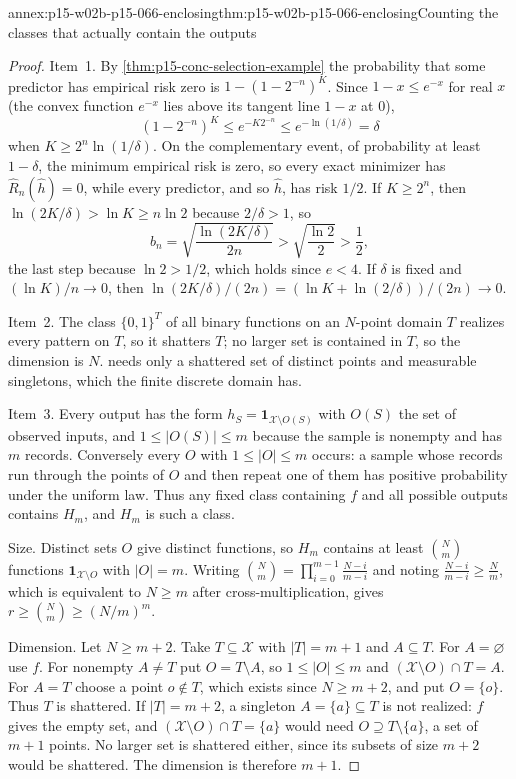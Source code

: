 \begin{annexitem}{annex:p15-w02b-p15-066-enclosing}{thm:p15-w02b-p15-066-enclosing}{Counting the classes that actually contain the outputs}
\begin{proof}
Item~1. By \cref{thm:p15-conc-selection-example} the probability that
some predictor has empirical risk zero is \(1-(1-2^{-n})^K\). Since
\(1-x\leq e^{-x}\) for real \(x\) (the convex function \(e^{-x}\) lies
above its tangent line \(1-x\) at \(0\)),
\[
 (1-2^{-n})^K\leq e^{-K2^{-n}}\leq e^{-\ln(1/\delta)}=\delta
\]
when \(K\geq2^n\ln(1/\delta)\). On the complementary event, of
probability at least \(1-\delta\), the minimum empirical risk is zero,
so every exact minimizer has \(\widehat R_n(\widehat h)=0\), while every
predictor, and so \(\widehat h\), has risk \(1/2\). If \(K\geq2^n\),
then \(\ln(2K/\delta)>\ln K\geq n\ln2\) because \(2/\delta>1\), so
\[
 b_n=\sqrt{\frac{\ln(2K/\delta)}{2n}}>\sqrt{\frac{\ln2}2}>\frac12,
\]
the last step because \(\ln2>1/2\), which holds since \(e<4\). If
\(\delta\) is fixed and \((\ln K)/n\to0\), then
\(\ln(2K/\delta)/(2n)=(\ln K+\ln(2/\delta))/(2n)\to0\).

Item~2. The class \(\{0,1\}^T\) of all binary functions on an
\(N\)-point domain \(T\) realizes every pattern on \(T\), so it shatters
\(T\); no larger set is contained in \(T\), so the dimension is \(N\).
 needs only a shattered set
of distinct points and measurable singletons, which the finite discrete
domain has.

Item~3. Every output has the form \(h_S=\mathbf1_{\mathcal X\setminus O(S)}\)
with \(O(S)\) the set of observed inputs, and \(1\leq|O(S)|\leq m\)
because the sample is nonempty and has \(m\) records. Conversely every
\(O\) with \(1\leq|O|\leq m\) occurs: a sample whose records run through
the points of \(O\) and then repeat one of them has positive probability
under the uniform law. Thus any fixed class containing \(f\) and all
possible outputs contains \(H_m\), and \(H_m\) is such a class.

Size. Distinct sets \(O\) give distinct functions, so \(H_m\) contains at
least \(\binom Nm\) functions \(\mathbf1_{\mathcal X\setminus O}\) with
\(|O|=m\). Writing
\(\binom Nm=\prod_{i=0}^{m-1}\frac{N-i}{m-i}\) and noting
\(\frac{N-i}{m-i}\geq\frac Nm\), which is equivalent to \(N\geq m\)
after cross-multiplication, gives \(r\geq\binom Nm\geq(N/m)^m\).

Dimension. Let \(N\geq m+2\). Take \(T\subseteq\mathcal X\) with
\(|T|=m+1\) and \(A\subseteq T\). For \(A=\varnothing\) use \(f\). For
nonempty \(A\ne T\) put \(O=T\setminus A\), so \(1\leq|O|\leq m\) and
\((\mathcal X\setminus O)\cap T=A\). For \(A=T\) choose a point
\(o\notin T\), which exists since \(N\geq m+2\), and put \(O=\{o\}\).
Thus \(T\) is shattered. If \(|T|=m+2\), a singleton \(A=\{a\}\subseteq T\)
is not realized: \(f\) gives the empty set, and
\((\mathcal X\setminus O)\cap T=\{a\}\) would need
\(O\supseteq T\setminus\{a\}\), a set of \(m+1\) points. No larger set is
shattered either, since its subsets of size \(m+2\) would be shattered.
The dimension is therefore \(m+1\).


\end{proof}
\end{annexitem}
